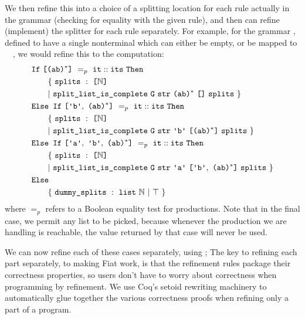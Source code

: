     We then refine this into a choice of a splitting location for each rule actually in the grammar (checking for equality with the given rule), and then can refine (implement) the splitter for each rule separately.  For example, for the grammar , defined to have a single nonterminal  which can either be empty, or be mapped to ~~, we would refine this to the computation:\label{sec:if-folding}
\newcommand{\ndcompfor}[3][]{%
#1\{~\farg{splits}~:~\typelist{\mathbb{N}} \\
&\phantom{#1} |~\fname{split\_list\_is\_complete}~\farg{G}~\farg{str}~#2~#3~\farg{splits}~\}
}
\begin{align*}
& \fname{If}~\valuelist{\nt{(ab)\ensuremath{^*}}}~=_p~\cons{\farg{it}}{\farg{its}}~\fname{Then} \\
&\ndcompfor[\qquad]{\nt{(ab)\ensuremath{^*}}}{\nil} \\
& \fname{Else~If}~\valuelist{\terminal{b},~\nt{(ab)\ensuremath{^*}}}~=_p~\cons{\farg{it}}{\farg{its}}~\fname{Then} \\
&\ndcompfor[\qquad]{\terminal{b}}{\valuelist{\nt{(ab)\ensuremath{^*}}}} \\
& \fname{Else~If}~\valuelist{\terminal{a},~\terminal{b},~\nt{(ab)\ensuremath{^*}}}~=_p~\cons{\farg{it}}{\farg{its}}~\fname{Then} \\
&\ndcompfor[\qquad]{\terminal{a}}{\valuelist{\terminal{b},~\nt{(ab)\ensuremath{^*}}}} \\
& \fname{Else} \\
&\qquad\{~\farg{dummy\_splits}~:~\indname{list}~\mathbb{N}~|~\True~\} \\
\end{align*}
       where $=_p$ refers to a Boolean equality test for productions.  Note that in the final case, we permit any list to be picked, because whenever the production we are handling is reachable, the value returned by that case will never be used.
    
       We can now refine each of these cases separately, using ;   The key to refining each part separately, to making Fiat work, is that the refinement rules package their correctness properties, so users don't have to worry about correctness when programming by refinement.  We use Coq's setoid rewriting machinery to automatically glue together the various correctness proofs when refining only a part of a program.
           
